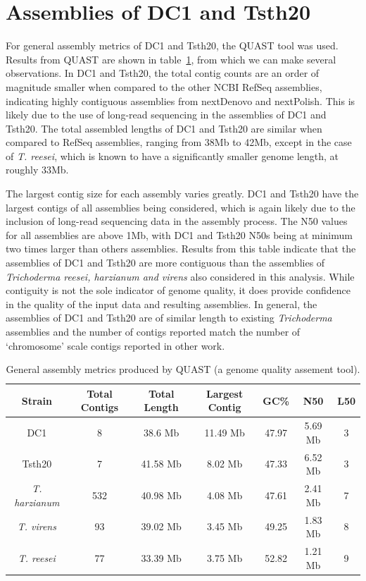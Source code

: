 \section{Assemblies of DC1 and Tsth20}

For general assembly metrics of DC1 and Tsth20, the QUAST tool was
used. Results from QUAST are shown in table~\ref{table:assemblies},
from which we can make several observations. In DC1 and Tsth20, the
total contig counts are an order of magnitude smaller when compared to
the other NCBI RefSeq assemblies, indicating highly contiguous
assemblies from nextDenovo and nextPolish. This is likely due to the
use of long-read sequencing in the assemblies of DC1 and Tsth20. The
total assembled lengths of DC1 and Tsth20 are similar when compared to
RefSeq assemblies, ranging from 38Mb to 42Mb, except in the case of
\textit{T. reesei}, which is known to have a significantly smaller
genome length\cite{Kubicek2019}, at roughly 33Mb.

The largest contig size for each assembly varies greatly. DC1 and
Tsth20 have the largest contigs of all assemblies being considered,
which is again likely due to the inclusion of long-read sequencing
data in the assembly process. The N50 values for all assemblies are
above 1Mb, with DC1 and Tsth20 N50s being at minimum two times larger
than others assemblies. Results from this table indicate that the
assemblies of DC1 and Tsth20 are more contiguous than the assemblies
of \textit{Trichoderma reesei, harzianum and virens} also considered
in this analysis. While contiguity is not the sole indicator of genome
quality, it does provide confidence in the quality of the input data
and resulting assemblies. In general, the assemblies of DC1 and Tsth20
are of similar length to existing \textit{Trichoderma} assemblies and
the number of contigs reported match the number of `chromosome' scale
contigs reported in other work.

\begin{table}
  \begin{center}
    \begin{tabular}{|c|c|c|c|c|c|c|}
      \hline
      Strain & Total Contigs & Total Length & Largest Contig & GC\% & N50 & L50 \\ \hline
      DC1 & 8 & 38.6 Mb & 11.49 Mb & 47.97 & 5.69 Mb & 3 \\ \hline
      Tsth20 & 7 & 41.58 Mb & 8.02 Mb & 47.33 & 6.52 Mb & 3 \\ \hline
      \textit{T. harzianum} & 532 & 40.98 Mb & 4.08 Mb & 47.61 & 2.41 Mb & 7 \\ \hline
      \textit{T. virens} & 93 & 39.02 Mb & 3.45 Mb & 49.25 & 1.83 Mb & 8 \\ \hline
      \textit{T. reesei} & 77 & 33.39 Mb & 3.75 Mb & 52.82 & 1.21 Mb & 9 \\ \hline
    \end{tabular}
  \end{center}
  \caption{General assembly metrics produced by QUAST (a
    genome quality assement tool).}
  \label{table:assemblies}
\end{table}

